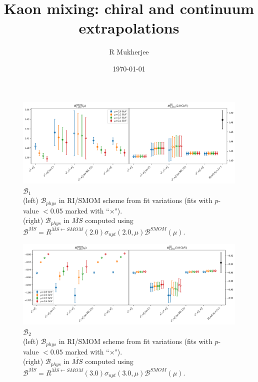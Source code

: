 \documentclass[12pt]{extarticle}
\title{Kaon mixing: chiral and continuum extrapolations}
\author{R Mukherjee}
\date{\today}
\begin{document}
\maketitle
\tableofcontents
\clearpage
\begin{figure}
\centering
\includegraphics[page=1, width=1.1\textwidth]{VVpAA/SUSY/fit_summary_bag.pdf}
\caption{$\mathcal{B}_{1}$\\(left) $\mathcal{B}_{phys}$ in RI/SMOM scheme from fit variations (fits with $p$-value $<0.05$ marked with ``$\times$"). \\(right) $\mathcal{B}_{phys}$ in $\overline{MS}$ computed using $\mathcal{B}^{\overline{MS}} = R^{\overline{MS}\leftarrow SMOM}(2.0)\sigma_{npt}(2.0,\mu) \mathcal{B}^{SMOM}(\mu)$.}
\end{figure}
\clearpage
\begin{figure}
\centering
\includegraphics[page=1, width=1.1\textwidth]{VVmAA/SUSY/fit_summary_bag.pdf}
\caption{$\mathcal{B}_{2}$\\(left) $\mathcal{B}_{phys}$ in RI/SMOM scheme from fit variations (fits with $p$-value $<0.05$ marked with ``$\times$"). \\(right) $\mathcal{B}_{phys}$ in $\overline{MS}$ computed using $\mathcal{B}^{\overline{MS}} = R^{\overline{MS}\leftarrow SMOM}(3.0)\sigma_{npt}(3.0,\mu) \mathcal{B}^{SMOM}(\mu)$.}
\end{figure}
\clearpage
\end{document}
